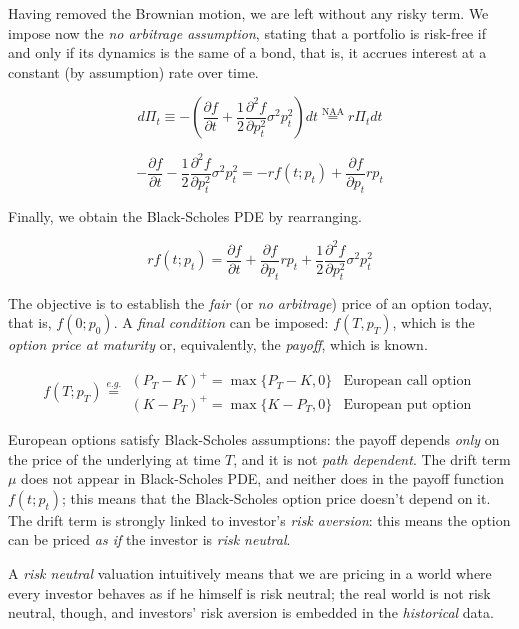 \documentclass[oneside,titlepage,headinclude,12pt,a4paper,BCOR5mm,footinclude]{book}
\theoremstyle{defn}
\newcommand\de\partial
\begin{document}
  Having removed  the Brownian motion,  we are left  without any risky  term. We
  impose now the  \textit{no arbitrage assumption}, stating that  a portfolio is
  risk-free if  and only  if its dynamics  is the  same of a  bond, that  is, it
  accrues interest at a constant (by assumption) rate over time.

  \[
    d\Pi_t \equiv - \left( \frac{\partial f}{\partial t} + 
      \frac{1}{2}\frac{\partial^2 f}{\partial p_t^2} \sigma^2 p_t^2 \right) dt 
      \stackrel{\text{NAA}}{=} r\Pi_t dt
  \]

  \[
    -\frac{\de f}{\de t} -\frac{1}{2}\frac{\de^2f}{\de p_t^2} \sigma^2 p_t^2 =
    -rf(t;p_t) + \frac{\de f}{\de p_t} rp_t
  \]

  Finally, we obtain the Black-Scholes PDE by rearranging.

  \[
    rf(t;p_t) = \frac{\de f}{\de t} + \frac{\de f}{\de p_t} rp_t + \frac{1}{2}\frac{\de^2 f}{\de p_t^2} \sigma^2 p_t^2
  \]

  The objective  is to  establish the  \textit{fair} (or  \textit{no arbitrage})
  price of an option today, that  is, $f(0;p_0)$. A \textit{final condition} can
  be imposed:  $f(T,p_T)$, which  is the \textit{option  price at  maturity} or,
  equivalently, the \textit{payoff}, which is known.

  \[
    f(T;p_T) \stackrel{e.g.}{=}
    \begin{array}{ll}
      (P_T - K)^+ = \max \{ P_T - K, 0 \} & \text{European call option} \\
      (K - P_T)^+ = \max \{ K - P_T, 0 \} & \text{European put option}
    \end{array}
  \]

  European  options  satisfy  Black-Scholes   assumptions:  the  payoff  depends
  \textit{only}  on the  price of  the underlying  at time  $T$, and  it is  not
  \textit{path dependent}. The drift term $\mu$ does not appear in Black-Scholes
  PDE, and neither  does in the payoff function $f(t;p_t)$;  this means that the
  Black-Scholes option  price doesn't depend on  it. The drift term  is strongly
  linked  to investor's  \textit{risk aversion}:  this means  the option  can be
  priced \textit{as if} the investor is \textit{risk neutral}.

  A \textit{risk neutral}  valuation intuitively means that we are  pricing in a
  world where every investor behaves as if  he himself is risk neutral; the real
  world is not risk neutral, though, and investors' risk aversion is embedded in
  the \textit{historical} data.
\end{document}
